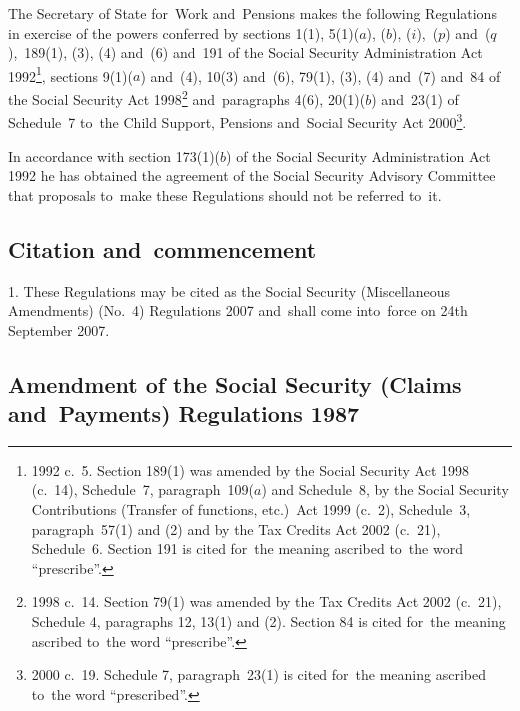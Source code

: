 \documentclass[12pt,a4paper]{article}
\title{\regstitle}
\author{S.I.\ 2007 No.\ 2470}
\date{Made
22nd August 2007\\
Laid before Parliament
28th August 2007\\
Coming into~force
24th September 2007
}
\begin{document}
\maketitle

\noindent
The Secretary of State for~Work and~Pensions makes the following Regulations in exercise of the powers conferred by sections 1(1), 5(1)($a$), ($b$), ($i$),~($p$)  and~($q$),~189(1), (3), (4) and~(6) and~191 of the Social Security Administration Act 1992\footnote{1992 c.~5. Section 189(1) was amended by the Social Security Act 1998 (c.~14), Schedule~7, paragraph~109($a$)  and Schedule~8, by the Social Security Contributions (Transfer of functions, etc.)\ Act 1999 (c.~2), Schedule~3, paragraph~57(1) and (2) and by the Tax Credits Act 2002 (c.~21), Schedule~6. Section 191 is cited for~the meaning ascribed to~the word “prescribe”.}, sections 9(1)($a$)  and~(4), 10(3) and~(6), 79(1), (3), (4) and~(7) and~84 of the Social Security Act 1998\footnote{1998 c.~14. Section 79(1) was amended by the Tax Credits Act 2002 (c.~21), Schedule 4, paragraphs 12, 13(1) and (2). Section 84 is cited for~the meaning ascribed to~the word “prescribe”.} and~paragraphs 4(6), 20(1)($b$)  and~23(1) of Schedule~7 to~the Child Support, Pensions and~Social Security Act 2000\footnote{2000 c.~19. Schedule 7, paragraph~23(1) is cited for~the meaning ascribed to~the word “prescribed”.}.

In accordance with section 173(1)($b$)  of the Social Security Administration Act 1992 he has obtained the agreement of the Social Security Advisory Committee that proposals to~make these Regulations should not be referred to~it. 

{\sloppy

\tableofcontents

}

\bigskip

\setcounter{secnumdepth}{-2}

\subsection[1. Citation and~commencement]{Citation and~commencement}

1.  These Regulations may be cited as the Social Security (Miscellaneous Amendments) (No.~4) Regulations 2007 and~shall come into~force on 24th September 2007.

\subsection[2. Amendment of the Social Security (Claims and~Payments) Regulations 1987]{Amendment of the Social Security (Claims and~Payments) Regulations 1987}
\end{document}
